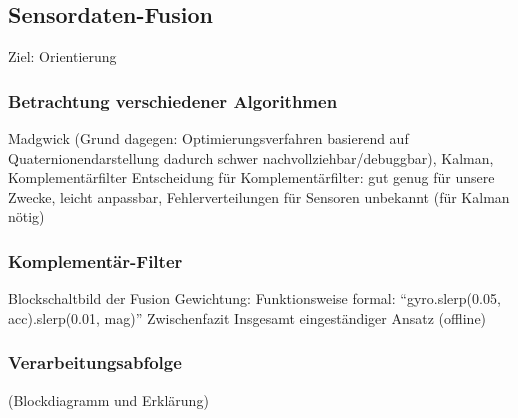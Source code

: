 \subsection{Sensordaten-Fusion}
Ziel: Orientierung
\subsubsection{Betrachtung verschiedener Algorithmen}
Madgwick (Grund dagegen: Optimierungsverfahren basierend auf Quaternionendarstellung dadurch schwer nachvollziehbar/debuggbar), Kalman, Komplementärfilter Entscheidung für Komplementärfilter: gut genug für unsere Zwecke, leicht anpassbar, Fehlerverteilungen für Sensoren unbekannt (für Kalman nötig)
\subsubsection{Komplementär-Filter}
Blockschaltbild der Fusion Gewichtung: Funktionsweise formal: “gyro.slerp(0.05, acc).slerp(0.01, mag)” Zwischenfazit Insgesamt eingeständiger Ansatz (offline)
\subsubsection{Verarbeitungsabfolge}
(Blockdiagramm und Erklärung)